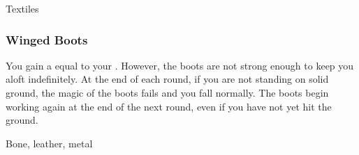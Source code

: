  Textiles


\lowercase{\hypertarget{item:Winged Boots}{}}\label{item:Winged Boots}
\hypertarget{item:Winged Boots}{\subsubsection{Winged Boots\hfill{}}}

You gain a  equal to your .
However, the boots are not strong enough to keep you aloft indefinitely.
At the end of each round, if you are not standing on solid ground, the magic of the boots fails and you fall normally.
The boots begin working again at the end of the next round, even if you have not yet hit the ground.



 Bone, leather, metal
